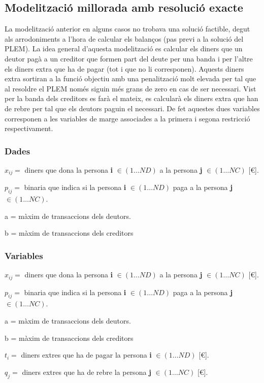 \subsection{Modelització millorada amb resolució exacte}
La modelització anterior en alguns casos no trobava una solució factible, degut als arrodoniments a l'hora de calcular els balanços (pas previ a la solució del PLEM).
La idea general d'aquesta modelització es calcular els diners que un deutor pagà a un creditor que formen part del deute per una banda i per l'altre els diners extra que ha de pagar (tot i que no li corresponen). Aquests diners extra sortiran a la funció objectiu amb una penalització molt elevada per tal que al resoldre el PLEM només siguin més grans de zero en cas de ser necessari. Vist per la banda dels creditors es farà el mateix, es calcularà els diners extra que han de rebre per tal que els deutors paguin el necessari. De fet aquestes dues variables corresponen a les variables de marge associades a la primera i segona restricció respectivament.

\subsubsection{Dades}
\begin{description}
\item $x_{ij}=$ diners que dona la persona \textbf{i} $\in (1 \ldots ND)$ a la persona \textbf{j} $\in (1 \ldots NC)$  [€].
\item $p_{ij}=$ binaria que indica si la persona \textbf{i} $\in (1 \ldots ND)$ paga a la persona \textbf{j} $\in (1 \ldots NC)$.
\item a = màxim de transaccions dels deutors.
\item b = màxim de transaccions dels creditors
\end{description}

\subsubsection{Variables}
\begin{description}
\item $x_{ij}=$ diners que dona la persona \textbf{i} $\in (1 \ldots ND)$ a la persona \textbf{j} $\in (1 \ldots NC)$  [€].
\item $p_{ij}=$ binaria que indica si la persona \textbf{i} $\in (1 \ldots ND)$ paga a la persona \textbf{j} $\in (1 \ldots NC)$.
\item a = màxim de transaccions dels deutors.
\item b = màxim de transaccions dels creditors 
\item $t_{i}=$ diners extres que ha de pagar la persona \textbf{i} $\in (1 \ldots ND)$  [€].
\item $q_{j}=$ diners extres que ha de rebre la persona \textbf{j} $\in (1 \ldots NC)$  [€].
\end{description}

